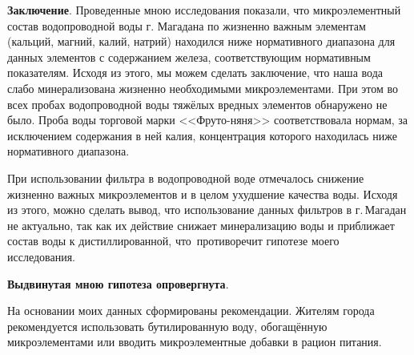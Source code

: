 \textbf{Заключение}. Проведенные мною исследования показали, что микроэлементный состав водопроводной воды г. Магадана по жизненно важным элементам (кальций, магний, калий, натрий) находился ниже нормативного диапазона для данных элементов с содержанием железа, соответствующим нормативным показателям. Исходя из этого, мы можем сделать заключение, что наша вода слабо минерализована жизненно необходимыми микроэлементами. При этом во всех пробах водопроводной воды тяжёлых вредных элементов обнаружено не было. Проба воды торговой марки <<Фруто-няня>> соответствовала нормам, за исключением содержания в ней калия, концентрация которого находилась ниже нормативного диапазона.

При использовании фильтра в водопроводной воде отмечалось снижение жизненно важных микроэлементов и в целом ухудшение качества воды. Исходя из этого, можно сделать вывод, что использование данных фильтров в г.\,Магадан не актуально, так как их действие снижает минерализацию воды и приближает состав воды к дистиллированной, что~противоречит гипотезе моего исследования.

\textbf{Выдвинутая мною гипотеза опровергнута}.

На основании моих данных сформированы рекомендации. Жителям города рекомендуется использовать бутилированную воду, обогащённую микроэлементами или вводить микроэлементные добавки в рацион питания.
